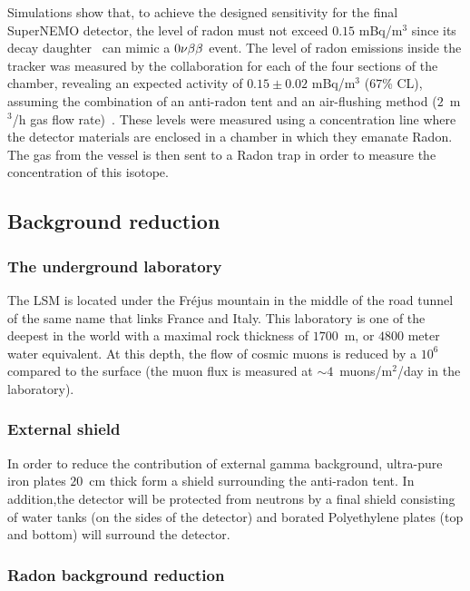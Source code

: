 Simulations show that, to achieve the designed sensitivity for the final SuperNEMO detector, the level of radon must not exceed $0.15$ mBq/m$^{3}$ since its decay daughter \Bi\ can mimic a $0\nu\beta\beta$ event.
The level of radon emissions inside the tracker was measured by the collaboration for each of the four sections of the chamber, revealing an expected activity of $0.15\pm0.02$ mBq/m$^{3}$ ($67$\% CL), assuming the combination of an anti-radon tent and an air-flushing method ($2$~m$^{3}$/h gas flow rate)~\cite{conf:radon2017}.
These levels were measured using a concentration line where the detector materials are enclosed in a chamber in which they emanate Radon.
The gas from the vessel is then sent to a Radon trap in order to measure the concentration of this isotope.


\subsection{Background reduction}
\label{subsec:background_reduc}

\subsubsection*{The underground laboratory}

The LSM is located under the Fréjus mountain in the middle of the road tunnel of the same name that links France and Italy.
This laboratory is one of the deepest in the world with a maximal rock thickness of $1700$~m, or $4800$ meter water equivalent.
At this depth, the flow of cosmic muons is reduced by a $10^{6}$ compared to the surface (the muon flux is measured at $\sim4$~muons/m$^{2}$/day in the laboratory).

\subsubsection*{External shield}

In order to reduce the contribution of external gamma background, ultra-pure iron plates $20$~cm thick form a shield surrounding the anti-radon tent.
In addition,the detector will be protected from neutrons by a final shield consisting of water tanks (on the sides of the detector) and borated Polyethylene plates (top and bottom) will surround the detector.

\subsubsection*{Radon background reduction}

